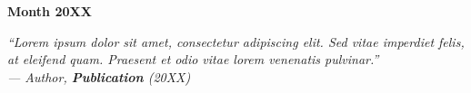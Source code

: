 \begin{titlepage}
\begin{center}
{\bfseries\fontsize{14}{16.8}\selectfont Month 20XX}\\

\end{center}

\end{titlepage}
\thispagestyle{empty}          %
\setcounter{page}{0}           %



\vspace*{\fill}

\begin{flushleft}\itshape\normalsize   %
``Lorem ipsum dolor sit amet, consectetur adipiscing elit. Sed vitae imperdiet felis, at eleifend quam. Praesent et odio vitae lorem venenatis pulvinar.''\\[1em]
\normalfont\small — Author, \textbf{Publication} (20XX)
\end{flushleft}

\vspace*{\fill}

\thispagestyle{empty}          %
\setcounter{page}{0}           %
